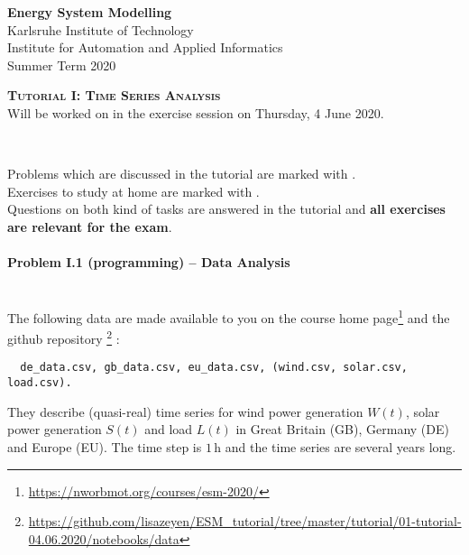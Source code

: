 \documentclass[11pt,a4paper,fleqn]{scrartcl}
\newcommand{\e}[1]{\ensuremath{\,\mathrm{#1}}}
\begin{document}
\begin{flushright}
 \textbf{Energy System Modelling }\\
 {\small Karlsruhe Institute of Technology}\\
 {\small Institute for Automation and Applied Informatics}\\
 {\small Summer Term 2020}\\
\end{flushright}

 
 \vspace{-0.5em}
 \hrulefill
 \vspace{0.3em}

\begin{center}
 \textbf{\textsc{\Large Tutorial I: Time Series Analysis}}\\
 \small Will be worked on in the exercise session on Thursday, 4 June 2020.\\[1.5em]
\end{center}

\vspace{-0.8em}
\hrulefill
\vspace{0.8em} \\
\begin{tcolorbox}
Problems which are discussed in the tutorial are marked with \faGroup. \\
Exercises to study at home are marked with \faHome. \\
Questions on both kind of tasks are answered in the tutorial and \textbf{all exercises are relevant for the exam}.
\end{tcolorbox}
\paragraph{Problem I.1 (programming) -- Data Analysis \faGroup}~\\

The following data are made available to you on the course home
page\footnote{\url{https://nworbmot.org/courses/esm-2020/}} and the github repository \footnote{\url{https://github.com/lisazeyen/ESM_tutorial/tree/master/tutorial/01-tutorial-04.06.2020/notebooks/data}} :
\begin{verbatim}
  de_data.csv, gb_data.csv, eu_data.csv, (wind.csv, solar.csv, load.csv).
\end{verbatim}
They describe (quasi-real) time series for wind power generation \(W(t)\), solar power generation \(S(t)\) and load \(L(t)\) in Great Britain (GB), Germany (DE) and Europe (EU). The time step is \(1\e{h}\) and the time series are several years long.
\end{document}
